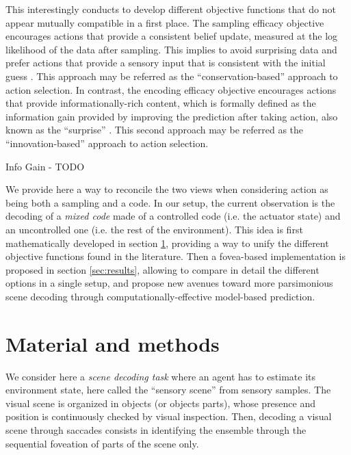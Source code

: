 \documentclass[12pt,twoside,openright]{article}
\begin{document}
This interestingly conducts to develop different objective functions that do not appear mutually compatible in a first place.
The sampling efficacy objective encourages actions that provide a consistent belief update, measured at the log likelihood of the data after sampling. This implies to avoid surprising data and prefer actions that provide a sensory input that is consistent with the initial guess \cite{friston2010free}. This  approach may be referred as the ``conservation-based'' approach to action selection.  
In contrast, the encoding efficacy objective encourages actions that provide informationally-rich content, which is formally defined as the information gain provided by improving the prediction after taking action, also known as the ``surprise'' \cite{itti2005bayesian}. This second approach may be referred as the ``innovation-based'' approach to action selection. 


{\color{blue} Info Gain - TODO

We provide here a way to reconcile the two views when considering action as being both a sampling and a code. 
In our setup, the current observation is the decoding of a \emph{mixed code}  
made of a controlled code (i.e. the actuator state) and an uncontrolled one (i.e. the rest of the environment). This idea is first mathematically developed in section \ref{sec:material}, providing a way to unify the different objective functions found in the literature. 
Then a fovea-based implementation is proposed in section \ref{sec:results}, allowing to compare in detail the different options in a single setup, and propose new avenues toward more parsimonious scene decoding through computationally-effective model-based prediction.}

\section{Material and methods} \label{sec:material}

We consider here a \emph{scene decoding task} where an agent has to estimate its environment state, here called the ``sensory scene'' from sensory samples. The visual scene is organized in objects (or objects parts), whose presence and position is continuously checked by visual inspection. 
Then, decoding a visual scene through saccades consists in identifying the ensemble through the sequential foveation of parts of the scene only. 
\end{document}
